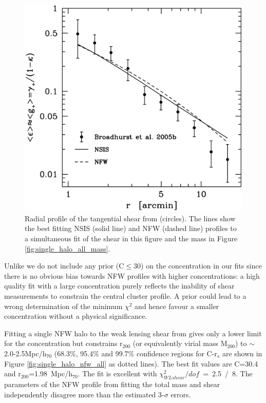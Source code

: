 \documentclass[useAMS,usenatbib]{mn2e}
\begin{document}
\begin{figure}
  \centering
  \includegraphics[width=\columnwidth]{figs/single_halo_gbbs_both_lin_shear.ps}
  \caption{ Radial profile of the tangential shear from
  \citet{broadhurst:05b} (circles). The lines show the best fitting
  NSIS (solid line) and NFW (dashed line) profiles to a simultaneous
  fit of the shear in this figure and the mass in Figure
  \ref{fig:single_halo_all_mass}. }
  \label{fig:single_halo_all_shear}
\end{figure}

Unlike \citet{broadhurst:05b} we do not include any prior (C$\le$30) on
the concentration in our fits since there is no obvious bias towards
NFW profiles with higher concentrations: a high quality fit with a
large concentration purely reflects the inability of shear
measurements to constrain the central cluster profile. A prior could
lead to a wrong determination of the minimum $\chi^2$ and hence favour
a smaller concentration without a physical significance.

Fitting a single NFW halo to the weak lensing shear from
\citet{broadhurst:05b} gives only a lower limit for the concentration
but constrains r$_{200}$ (or equivalently virial mass M$_{200}$) to
$\sim$ 2.0-2.5Mpc/h$_{70}$ (68.3\%, 95.4\% and 99.7\% confidence
regions for C-r$_s$ are shown in Figure \ref{fig:single_halo_nfw_all}
as dotted lines). The best fit values are C=30.4 and
r$_{200}$=1.98~Mpc/h$_{70}$. The fit is excellent with $\chi^2_{WL
shear}/dof$~=~2.5~/~8. The parameters of the NFW profile from fitting
the total mass and shear independently disagree more than the
estimated 3-$\sigma$ errors.
\end{document}
